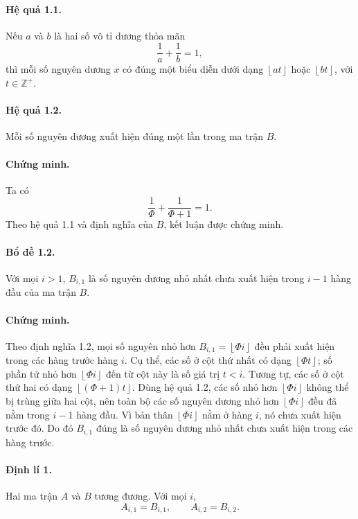 \documentclass[11pt]{article}
\newcommand{\floor}[1]{\left\lfloor #1\right\rfloor}
\begin{document}
\paragraph{Hệ quả 1.1.}
Nếu \(a\) và \(b\) là hai số vô tỉ dương thỏa mãn
\[
  \frac{1}{a}+\frac{1}{b}=1,
\]
thì mỗi số nguyên dương \(x\) có đúng một biểu diễn dưới dạng \(\floor{at}\)
hoặc \(\floor{bt}\), với \(t\in\mathbb{Z}^{+}\).

\paragraph{Hệ quả 1.2.}
Mỗi số nguyên dương xuất hiện đúng một lần trong ma trận \(B\).

\paragraph{Chứng minh.}
Ta có
\[
  \frac{1}{\Phi}+\frac{1}{\Phi+1}=1.
\]
Theo hệ quả 1.1 và định nghĩa của \(B\), kết luận được chứng minh.

\paragraph{Bổ đề 1.2.}
Với mọi \(i>1\), \(B_{i,1}\) là số nguyên dương nhỏ nhất chưa xuất hiện trong
\(i-1\) hàng đầu của ma trận \(B\).

\paragraph{Chứng minh.}
Theo định nghĩa 1.2, mọi số nguyên nhỏ hơn \(B_{i,1}=\floor{\Phi i}\) đều phải
xuất hiện trong các hàng trước hàng \(i\). Cụ thể, các số ở cột thứ nhất có
dạng \(\floor{\Phi t}\); số phần tử nhỏ hơn \(\floor{\Phi i}\) đến từ cột
này là số giá trị \(t<i\). Tương tự, các số ở cột thứ hai có dạng
\(\floor{(\Phi+1)t}\). Dùng hệ quả 1.2, các số nhỏ hơn \(\floor{\Phi i}\)
không thể bị trùng giữa hai cột, nên toàn bộ các số nguyên dương nhỏ hơn
\(\floor{\Phi i}\) đều đã nằm trong \(i-1\) hàng đầu. Vì bản thân
\(\floor{\Phi i}\) nằm ở hàng \(i\), nó chưa xuất hiện trước đó. Do đó
\(B_{i,1}\) đúng là số nguyên dương nhỏ nhất chưa xuất hiện trong các hàng
trước.

\paragraph{Định lí 1.}
Hai ma trận \(A\) và \(B\) tương đương. Với mọi \(i\),
\[
  A_{i,1}=B_{i,1},\qquad A_{i,2}=B_{i,2}.
\]
\end{document}
